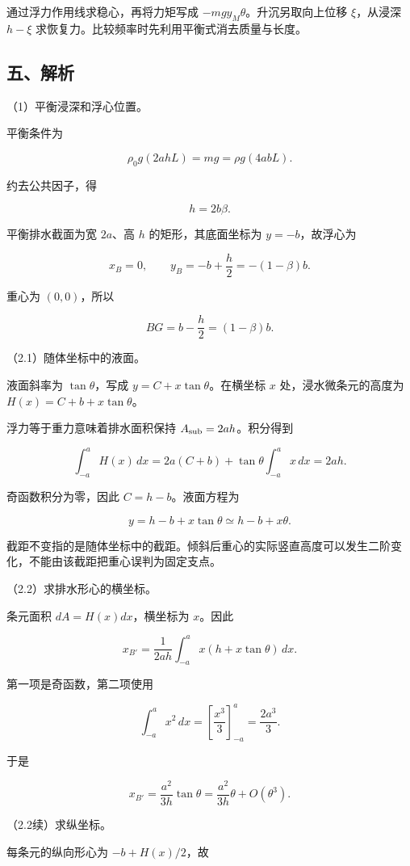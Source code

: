 \documentclass[12pt,a4paper,fontset=fandol]{ctexart}
\begin{document}
通过浮力作用线求稳心，再将力矩写成 \(-mgy_M\theta\)。升沉另取向上位移
\(\xi\)，从浸深 \(h-\xi\)
求恢复力。比较频率时先利用平衡式消去质量与长度。

\subsection{五、解析}\label{ux4e94ux89e3ux6790-4}

（1）平衡浸深和浮心位置。

平衡条件为

\[
\rho_0g(2ahL)=mg=\rho g(4abL).
\]

约去公共因子，得

\[
\boxed{h=2b\beta.}
\tag{5.1}
\]

平衡排水截面为宽 \(2a\)、高 \(h\) 的矩形，其底面坐标为
\(y=-b\)，故浮心为

\[
x_B=0,\qquad y_B=-b+\frac h2=-(1-\beta)b.
\]

重心为 \((0,0)\)，所以

\[
\boxed{BG=b-\frac h2=(1-\beta)b.}
\]

（2.1）随体坐标中的液面。

液面斜率为 \(\tan\theta\)，写成 \(y=C+x\tan\theta\)。在横坐标 \(x\)
处，浸水微条元的高度为 \(H(x)=C+b+x\tan\theta\)。

浮力等于重力意味着排水面积保持 \(A_{\rm sub}=2ah\)。积分得到

\[
\int_{-a}^aH(x)\,dx=2a(C+b)
+\tan\theta\int_{-a}^a x\,dx=2ah.
\]

奇函数积分为零，因此 \(C=h-b\)。液面方程为

\[
\boxed{y=h-b+x\tan\theta\simeq h-b+x\theta.}
\tag{5.2}
\]

截距不变指的是随体坐标中的截距。倾斜后重心的实际竖直高度可以发生二阶变化，不能由该截距把重心误判为固定支点。

（2.2）求排水形心的横坐标。

条元面积 \(dA=H(x)dx\)，横坐标为 \(x\)。因此

\[
x_{B'}=\frac{1}{2ah}\int_{-a}^a x(h+x\tan\theta)\,dx.
\]

第一项是奇函数，第二项使用

\[
\int_{-a}^a x^2\,dx=\left[\frac{x^3}{3}\right]_{-a}^a=\frac{2a^3}{3}.
\]

于是

\[
x_{B'}=\frac{a^2}{3h}\tan\theta
=\frac{a^2}{3h}\theta+O(\theta^3).
\tag{5.3}
\]

（2.2续）求纵坐标。

每条元的纵向形心为 \(-b+H(x)/2\)，故
\end{document}

